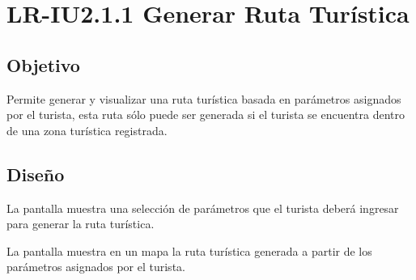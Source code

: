 \newpage
\section{LR-IU2.1.1 Generar Ruta Turística}

\subsection{Objetivo}
Permite generar y visualizar una ruta turística basada en parámetros asignados por el turista, esta ruta sólo puede ser generada si el turista se encuentra dentro de una zona turística registrada.

\subsection{Diseño}
La pantalla  muestra una selección de parámetros que el turista deberá ingresar para generar la ruta turística. 


\newpage
La pantalla  muestra en un mapa la ruta turística generada a partir de los parámetros asignados por el turista.
